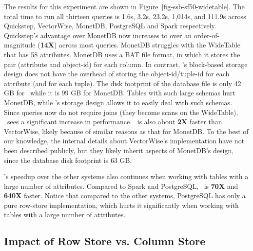 The results for this experiment are shown in Figure~\ref{fig-ssb-sf50-widetable}. The total time to run all thirteen queries is 1.6s, 3.2s, 	23.2s, 1,014s, and	111.9s across Quickstep, VectorWise, MonetDB, PostgreSQL and Spark respectively. Quickstep's  advantage over MonetDB now increases to over an order-of-magnitude (\textbf{14X}) across most queries.
MonetDB struggles with the WideTable that has 58 attributes. MonetDB uses a BAT file format, in which it stores the pair (attribute and object-id) for each column. In contrast, \Quickstep's block-based storage design does not have the overhead of storing the object-id/tuple-id for each attribute (and for each tuple). The disk footprint of the database file is only 42 GB for \Quickstep\ while it is 99 GB for MonetDB. Tables with such large schemas hurt MonetDB, while \Quickstep's storage design allows it to easily deal with such schemas. Since queries now do not require joins (they become scans on the WideTable), \Quickstep\ sees a significant increase in performance.
\Quickstep\ is also about \textbf{2X} faster than VectorWise, likely because of similar reasons as that for MonetDB. To the best of our knowledge, the internal details about VectorWise's implementation have not been described publicly, but they likely inherit aspects of MonetDB's design, since the database disk footprint is 63 GB.

\Quickstep's speedup over the other systems also continues when working with tables with a large number of attributes. Compared to Spark and PostgreSQL, \Quickstep\ is \textbf{70X} and \textbf{640X} faster. Notice that compared to the other systems, PostgreSQL has only a pure row-store implementation, which hurts it significantly when working with tables with a large number of attributes.

\subsection{Impact of Row Store vs. Column Store}
\label{sec:expt:rs-vs-cs}

